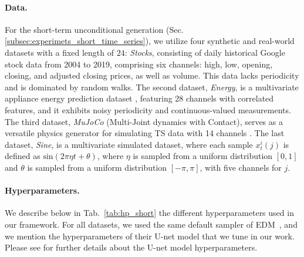 \documentclass{article}
\begin{document}
\paragraph{Data.} For the short-term unconditional generation (Sec. \ref{subsec:experimets_short_time_series}), we utilize four synthetic and real-world datasets with a fixed length of $24$: \textit{Stocks}, consisting of daily historical Google stock data from 2004 to 2019, comprising six channels: high, low, opening, closing, and adjusted closing prices, as well as volume. This data lacks periodicity and is dominated by random walks. The second dataset, \textit{Energy}, is a multivariate appliance energy prediction dataset \cite{candanedo2017data}, featuring 28 channels with correlated features, and it exhibits noisy periodicity and continuous-valued measurements. The third dataset, \textit{MuJoCo} (Multi-Joint dynamics with Contact), serves as a versatile physics generator for simulating TS data with 14 channels \cite{todorov2012mujoco}. The last dataset, \textit{Sine}, is a multivariate simulated dataset, where each sample $x_{t}^{i}(j)$ is defined as $\text{sin}(2 \pi \eta t + \theta)$, where $\eta$ is sampled from a uniform distribution $[0,1]$ and $\theta$ is sampled from a uniform distribution $[-\pi, \pi]$, with five channels for $j$.  

\paragraph{Hyperparameters.}
We describe below in Tab.~\ref{tab:hp_short} the different hyperparameters used in our framework. For all datasets, we used the same default sampler of EDM~\cite{karras2022elucidating}, and we mention the hyperparameters of their U-net model that we tune in our work. Please see \cite{karras2022elucidating} for further details about the U-net model hyperparameters.
\end{document}
